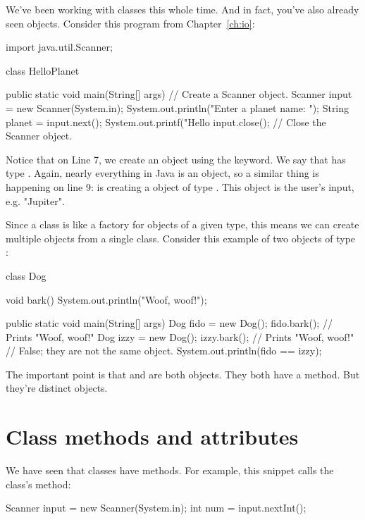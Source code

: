 We've been working with classes this whole time. And in fact, you've also already seen objects. Consider this program from Chapter~\ref{ch:io}:

\begin{code}
import java.util.Scanner;

class HelloPlanet {

    public static void main(String[] args) {
        // Create a Scanner object.
        Scanner input = new Scanner(System.in);
        System.out.println("Enter a planet name: ");
        String planet = input.next();
        System.out.printf("Hello %
        input.close();  // Close the Scanner object.
    }
}
\end{code}

Notice that on Line 7, we create an object  using the  keyword. We say that  has type . Again, nearly everything in Java is an object, so a similar thing is happening on line 9:  is creating a  object of type . This object is the user's input, e.g. "Jupiter".

Since a class is like a factory for objects of a given type, this means we can create multiple objects from a single class. Consider this example of two objects of type :

\begin{code}
class Dog {

    void bark() {
        System.out.println("Woof, woof!");
    }
    
    public static void main(String[] args) {
        Dog fido = new Dog();
        fido.bark();  // Prints "Woof, woof!"
        Dog izzy = new Dog();
        izzy.bark();  // Prints "Woof, woof!"
        // False; they are not the same object.
        System.out.println(fido == izzy);
    }
}
\end{code}

The important point is that  and  are both  objects. They both have a  method. But they're distinct objects.

\section{Class methods and attributes}

We have seen that classes have methods. For example, this snippet calls the  class's  method:

\begin{code}
Scanner input = new Scanner(System.in);
int num = input.nextInt();
\end{code}

